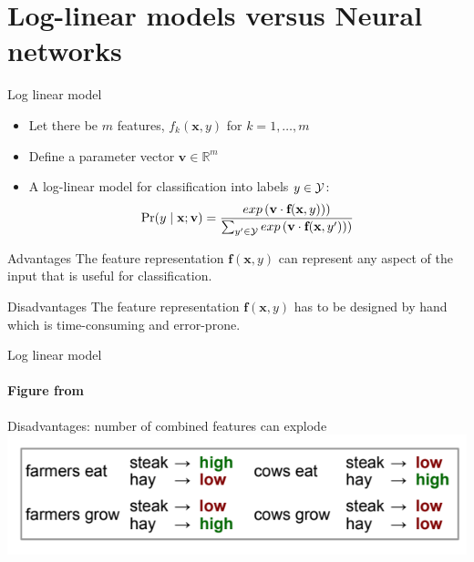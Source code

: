 




\section{Log-linear models versus Neural networks}
\frame{\tableofcontents[currentsection]}

\begin{frame}{Log linear model}
\begin{itemize}[<+->]
\item Let there be $m$ features, $f_k(\textbf{x}, y)$ for $k = 1, \ldots, m$
\item Define a parameter vector $\textbf{v} \in \mathbb{R}^m$
\item A log-linear model for classification into labels $y \in {\cal Y}$: 
\[ \Pr(y \mid \textbf{x}; \textbf{v}) = \frac{exp\left(\textbf{v} \cdot \textbf{f}(\textbf{x}, y))\right)}{\sum_{y' \in {\cal Y}} exp\left(\textbf{v} \cdot \textbf{f}(\textbf{x}, y'))\right)} \]
\end{itemize}
\pause
\begin{block}{Advantages}
The feature representation $\textbf{f}(\textbf{x}, y)$ can represent any aspect of the input that is useful for classification.
\end{block}
\pause
\begin{block}{Disadvantages}
The feature representation $\textbf{f}(\textbf{x}, y)$ has to be designed by hand which is time-consuming and error-prone.
\end{block}
\end{frame}

\begin{frame}{Log linear model}
\framesubtitle{Figure from \cite{Neubig2018}}
\begin{block}{Disadvantages: number of combined features can explode}
\includegraphics[scale=0.5]{figures/ff/combinedfeats.png}
\end{block}
\end{frame}

